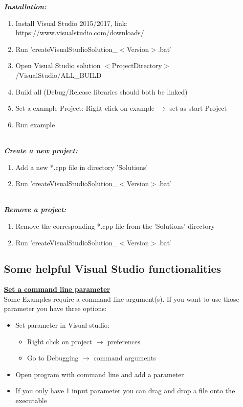 \documentclass[]{article}
\begin{document}
\textit{\textbf{Installation:}}
\begin{enumerate}
	\item Install Visual Studio 2015/2017, link: \url{https://www.visualstudio.com/downloads/}
	\item Run 'createVisualStudioSolution\_$<$Version$>$.bat'
	\item Open Visual Studio solution $<$ProjectDirectory$>$/VisualStudio/ALL\_BUILD
	\item Build all (Debug/Release libraries should both be linked)
	\item Set a example Project: Right click on example $\rightarrow$ set as start Project
	\item Run example 
\end{enumerate}

\mbox{} \\
\textit{\textbf{Create a new project:}}
\begin{enumerate}
\item Add a new *.cpp file in directory 'Solutions'
\item Run 'createVisualStudioSolution\_$<$Version$>$.bat'
\end{enumerate}

\mbox{} \\
\textit{\textbf{Remove a project:}}
\begin{enumerate}
\item Remove the corresponding *.cpp file from the 'Solutions' directory
\item Run 'createVisualStudioSolution\_$<$Version$>$.bat' \\
\end{enumerate}

\subsection{Some helpful Visual Studio functionalities \\}

\underline{\textbf{Set a command line parameter}} \\

Some Examples require a command line argument(s). If you want to use those parameter you have three options:
\begin{itemize}
	\item Set parameter in Visual studio:
	\begin{itemize}
		\item Right click on project $\rightarrow$ preferences
		\item Go to Debugging $\rightarrow$ command arguments
	\end{itemize}
	\item Open program with command line and add a parameter
	\item If you only have 1 input parameter you can drag and drop a file onto the executable
\end{itemize}
\end{document}
